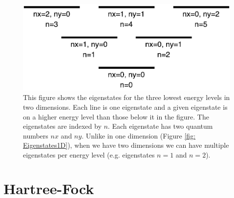 \documentclass[../main.tex]{subfiles}
\begin{document}
\begin{figure}[!ht]
    \centering
    \includegraphics[scale=0.7]{figures/Eigenstates2D}
    \caption{This figure shows the eigenstates for the three lowest energy levels in two dimensions. Each line is one eigenstate and a given eigenstate is on a higher energy level than those below it in the figure. The eigenstates are indexed by $n$. Each eigenstate has two quantum numbers $nx$ and $ny$. Unlike in one dimension (Figure \ref{fig: Eigenstates1D}), when we have two dimensions we can have multiple eigenstates per energy level (e.g. eigenstates $n=1$ and $n=2$).}
    \label{fig: Eigenstates2D}
\end{figure}


\chapter{Hartree-Fock}
\end{document}
